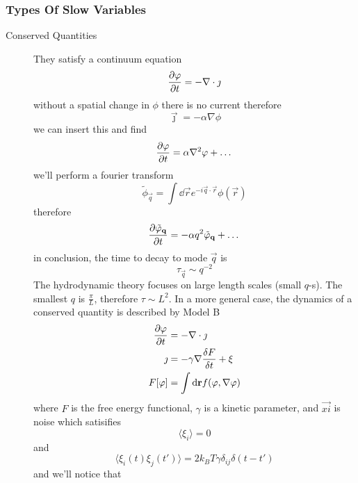 \subsubsection{Types Of Slow Variables}
\begin{description}
	\item[Conserved Quantities] They satisfy a continuum equation\begin{equation}
		\diffp{\phi}{t}=-\nabla\cdot\vec{\jmath}
	\end{equation}
	without a spatial change in \(\phi \) there is no current therefore
	\begin{equation}
		\vec{\jmath} = -\alpha\nabla\phi
	\end{equation}
	we can insert this and find
	\begin{equation}
		\diffp{\phi}{t} = \alpha\nabla^2\phi+\dots
	\end{equation}
	we'll perform a fourier transform
	\begin{equation}
		\tilde\phi_\vec{q} = \int\dd \vec{r} e^{-i\vec{q}\cdot\vec{r}}\phi(\vec{r})
	\end{equation}
	therefore
	\begin{equation}
		\diffp{\tilde\phi_\vec{q}}{t} = -\alpha q^2\tilde\phi_\vec{q}+\dots
	\end{equation}
	in conclusion, the time to decay to mode \(\vec{q}\) is
	\begin{equation}
		\tau_\vec{q} \sim q^{-2}
	\end{equation}
	The hydrodynamic theory focuses on large length scales (small \(q\)-s). The smallest \(q\) is \(\frac{\pi}{L}\), therefore \(\tau \sim L^2\). In a more general case, the dynamics of a conserved quantity is described by Model B
	\begin{align}
		\diffp{\phi}{t} &= -\nabla\cdot \vec{\jmath}\\
		\vec{\jmath} &= -\gamma\nabla\frac{\delta F}{\delta t}+\vec{\xi}\\
		F[\phi] &= \int\dd \vec{r}f(\phi,\nabla\phi)
	\end{align}
	where \(F\) is the free energy functional, \(\gamma \) is a kinetic parameter, and \(\vec{xi}\) is noise which satisifies
	\begin{equation}
		\langle\xi_i\rangle = 0
	\end{equation}
	and
	\begin{equation}
		\langle\xi_i(t)\xi_j(t')\rangle = 2k_B T\gamma\delta_{ij}\delta(t-t')
	\end{equation}
	and we'll notice that

\end{description}
